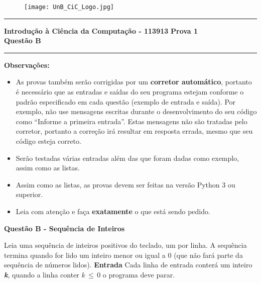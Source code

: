 \documentclass[a4paper, 12pt]{article}
\begin{document}
\begin{figure}[H]
	\texttt{[image: UnB\_CiC\_Logo.jpg]}
\end{figure}
\noindent\rule{\textwidth}{0.4pt}
\begin{center}
	\textbf{{\Large Introdução à Ciência da Computação - 113913}} \newline \newline
	\textbf{{\large Prova 1} \\
	\vspace{9pt}
	{\large Questão B}} \\
	\noindent\rule{\textwidth}{0.4pt}
	\newline
\end{center}

\textbf{{\large Observações:}}
\begin{itemize}
	\item As provas também serão corrigidas por um \textbf{corretor automático}, portanto é necessário que as entradas e saídas do seu programa estejam conforme o padrão especificado em cada questão (exemplo de entrada e saída). Por exemplo, não use mensagens escritas durante o desenvolvimento do seu código como “Informe a primeira entrada”. Estas mensagens não são tratadas pelo corretor, portanto a correção irá resultar em resposta errada, mesmo que seu código esteja correto.
	\item Serão testadas várias entradas além das que foram dadas como exemplo, assim como as listas.
	\item Assim como as listas, as provas devem ser feitas na versão Python 3 ou superior.
	\item Leia com atenção e faça \textbf{exatamente} o que está sendo pedido.
\end{itemize}
\newpage %
\begin{center}
\textbf{{\Large Questão B - Sequência de Inteiros}}
\end{center}
\vspace{5pt}
Leia uma sequência de inteiros positivos do teclado, um por linha. A sequência termina quando for lido um inteiro menor ou igual a 0 (que não fará parte da sequência de números lidos).
\newline \newline
\textbf{{\large Entrada}} \newline
Cada linha de entrada conterá um inteiro \textbf{\textit{k}}, quando a linha conter 
$k\, \leq \, 0$ o programa deve parar.
\newline \newline
\end{document}
